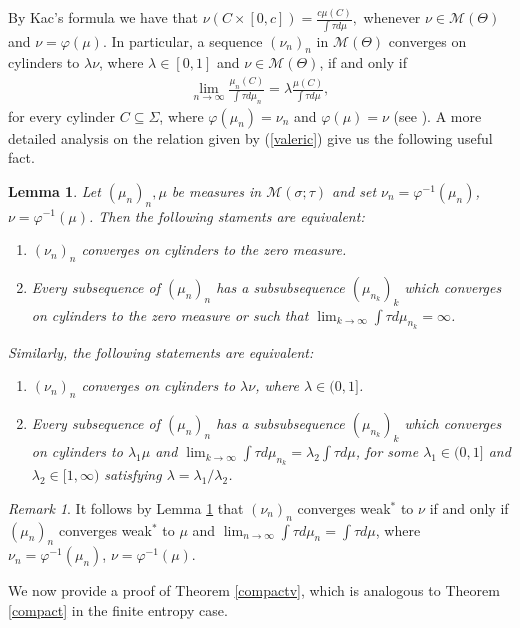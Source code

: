 \documentclass[letterpaper,11pt]{amsart}
\theoremstyle{plain}
\theoremstyle{plain}
\newtheorem{lemma}[proposition]{Lemma}
\theoremstyle{definition}
\theoremstyle{remark}
\newtheorem{remark}{Remark}[section]
\def\M{{\mathcal M}}
\begin{document}
 By Kac's formula we have that $\nu(C\times [0,c])=\frac{c\mu(C)}{\int \tau d\mu},$ whenever $\nu\in \M(\Theta)$ and $\nu=\varphi(\mu)$. In particular, a sequence $(\nu_n)_n$ in $\M(\Theta)$ converges on cylinders to $\lambda \nu$, where $\lambda\in [0,1]$ and $\nu\in \M(\Theta)$, if and only if
 \begin{align}\label{valeric} \lim_{n\to\infty}\frac{\mu_n(C)}{\int \tau d\mu_n}=\lambda\frac{\mu(C)}{\int \tau d\mu},\end{align}
for every cylinder $C\subseteq \Sigma$, where $\varphi(\mu_n)=\nu_n$ and $\varphi(\mu)=\nu$ (see \cite[Remark 6.5]{iv}). A more detailed analysis on the relation given by (\ref{valeric}) give us the following useful fact.

\begin{lemma}\label{topsv} Let $(\mu_n)_n, \mu$ be measures in $\M(\sigma;\tau)$ and set $\nu_n=\varphi^{-1}(\mu_n)$, $\nu=\varphi^{-1}(\mu)$. Then the following staments are equivalent:
\begin{enumerate}
\item  $(\nu_n)_n$ converges on cylinders to the zero measure. 
\item Every subsequence of $(\mu_n)_n$ has a subsubsequence $(\mu_{n_k})_k$ which converges on cylinders to the zero measure or 
such that $\lim_{k\to\infty}\int \tau d\mu_{n_k}=\infty$.
\end{enumerate}
Similarly, the following statements are equivalent:
\begin{enumerate}
\item  $(\nu_n)_n$ converges on cylinders to $\lambda\nu$, where $\lambda\in (0,1]$. 
\item Every subsequence of $(\mu_n)_n$ has a subsubsequence $(\mu_{n_k})_k$ which converges on cylinders to $\lambda_1\mu$ and 
 $\lim_{k\to\infty}\int \tau d\mu_{n_k}=\lambda_2\int \tau d\mu$, for some $\lambda_1\in (0,1]$ and $\lambda_2\in [1,\infty)$ satisfying   $\lambda=\lambda_1/\lambda_2$.
\end{enumerate}
\end{lemma}

\begin{remark} It follows by Lemma \ref{topsv} that $(\nu_n)_n$ converges weak$^*$ to $\nu$ if and only if $(\mu_n)_n$ converges weak$^*$ to $\mu$ and $\lim_{n\to\infty} \int\tau d\mu_n=\int \tau d\mu$, where $\nu_n=\varphi^{-1}(\mu_n)$, $\nu=\varphi^{-1}(\mu)$.
\end{remark}

We now provide a proof of Theorem \ref{compactv}, which is analogous to Theorem \ref{compact} in the finite entropy case.
\end{document}
